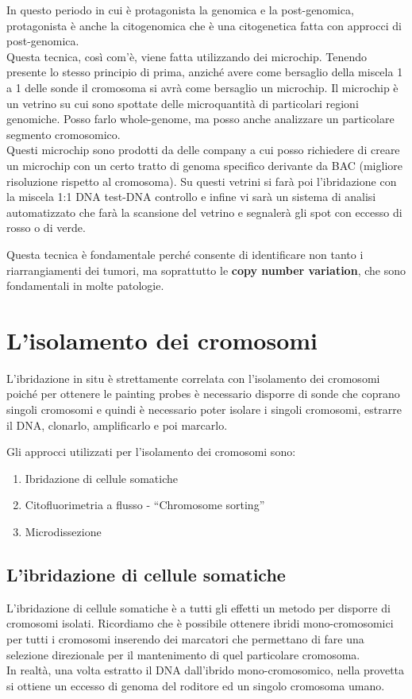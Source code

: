 \documentclass[11pt]{book}
\begin{document}
In questo periodo in cui è protagonista la genomica e la post-genomica, protagonista è anche la citogenomica che è una citogenetica fatta con approcci di post-genomica.\\
Questa tecnica, così com’è, viene fatta utilizzando dei microchip. Tenendo presente lo stesso principio di prima, anziché avere come bersaglio della miscela 1 a 1 delle sonde il cromosoma si avrà come bersaglio un microchip.
Il microchip è un vetrino su cui sono spottate delle microquantità di particolari regioni genomiche. Posso farlo whole-genome, ma posso anche analizzare un particolare segmento cromosomico.\\
Questi microchip sono prodotti da delle company a cui posso richiedere di creare un microchip con un certo tratto di genoma specifico derivante da BAC (migliore risoluzione rispetto al cromosoma). 
Su questi vetrini si farà poi l'ibridazione con la miscela 1:1 DNA test-DNA controllo e infine vi sarà un sistema di analisi automatizzato che farà la scansione del vetrino e segnalerà gli spot con eccesso di rosso o di verde.

Questa tecnica è fondamentale perché consente di identificare non tanto i riarrangiamenti dei tumori, ma soprattutto le \textbf{copy number variation}, che sono fondamentali in molte patologie.


\chapter{L'isolamento dei cromosomi}
L’ibridazione in situ è strettamente correlata con l’isolamento dei cromosomi poiché per ottenere le painting probes è necessario disporre di sonde che coprano singoli cromosomi e quindi è necessario poter isolare i singoli cromosomi, estrarre il DNA, clonarlo, amplificarlo e poi marcarlo.

Gli approcci utilizzati per l’isolamento dei cromosomi sono:
\begin{enumerate}
\item Ibridazione di cellule somatiche
\item Citofluorimetria a flusso - ``Chromosome sorting''
\item Microdissezione
\end{enumerate}


\section{L'ibridazione di cellule somatiche}
L’ibridazione di cellule somatiche è a tutti gli effetti un metodo per disporre di cromosomi isolati.
Ricordiamo che è possibile ottenere ibridi mono-cromosomici per tutti i cromosomi inserendo dei marcatori che permettano di fare una selezione direzionale per il mantenimento di quel particolare cromosoma.\\
In realtà, una volta estratto il DNA dall’ibrido mono-cromosomico, nella provetta si ottiene un eccesso di genoma del roditore ed un singolo cromosoma umano.
\end{document}
